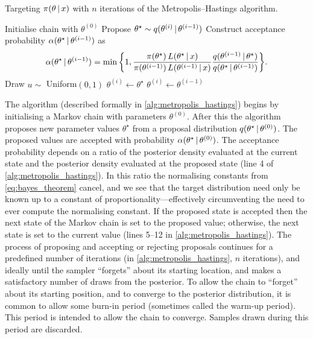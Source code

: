 \begin{algorithm}
  \caption{Targeting $\pi(\theta \,|\, x)$ with $n$ iterations of the
    Metropolis--Hastings algorithm.}
  \label{alg:metropolis_hastings}
  \begin{algorithmic}[1]
    \State Initialise chain with $\theta^{(0)}$
      \State Propose ${\theta}^\star \sim q(\theta^{(i)} \,|\, \theta^{(i-1)})$
      \State Construct acceptance probability $\alpha(\theta^\star \,|\, \theta^{(i-1)})$ as
      \begin{equation*}
          \alpha(\theta^\star \given \theta^{(i-1)}) =
        \min\bigg\{1,
        \frac{\pi(\theta^\star) \, L(\theta^\star \given  x)}%
        {\pi(\theta^{(i-1)}) \, L(\theta^{(i-1)} \given  x)}
        \frac{q(\theta^{(i-1)} \given \theta^\star)}%
        {q(\theta^\star \given \theta^{(i-1)})}
        \bigg\}.
      \end{equation*}
      \State Draw $u \sim$ Uniform$(0, 1)$
        \State {}
        \State $\theta^{(i)} \leftarrow \theta^\star$
      \Else
        \State {}
        \State $\theta^{(i)} \leftarrow \theta^{(i-1)}$
      \EndIf
    \EndFor
  \end{algorithmic}
\end{algorithm}

The algorithm (described formally in \cref{alg:metropolis_hastings}) begins by
initialising a Markov chain with parameters $\theta^{(0)}$. After this the
algorithm proposes new parameter values $\theta^\star$ from a proposal
distribution $q(\theta^\star \,|\, \theta^{(0)})$. The proposed values are
accepted with probability $\alpha(\theta^\star \,|\, \theta^{(0)})$. The
acceptance probability depends on a ratio of the posterior density evaluated at
the current state and the posterior density evaluated at the proposed state
(line 4 of \cref{alg:metropolis_hastings}). In this ratio the normalising
constants from \cref{eq:bayes_theorem} cancel, and we see that the target
distribution need only be known up to a constant of
proportionality---effectively circumventing the need to ever compute the
normalising constant. If the proposed state is accepted then the next state of
the Markov chain is set to the proposed value; otherwise, the next state is set
to the current value (lines 5--12 in \cref{alg:metropolis_hastings}). The
process of proposing and accepting or rejecting proposals continues for a
predefined number of iterations (in \cref{alg:metropolis_hastings}, $n$
iterations), and ideally until the sampler ``forgets'' about its starting
location, and makes a satisfactory number of draws from the posterior. To allow
the chain to ``forget'' about its starting position, and to converge to the
posterior distribution, it is common to allow some burn-in period (sometimes
called the warm-up period). This period is intended to allow the chain to
converge. Samples drawn during this period are discarded.

